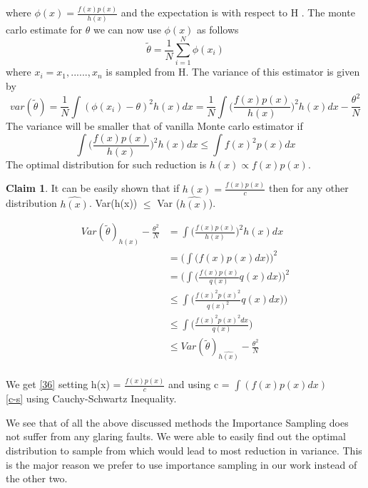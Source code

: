 \documentclass[a4paper,twoside]{iiththesis}
\theoremstyle{definition}
\theoremstyle{definition}
\newtheorem{claim}{Claim}[section]
\theoremstyle{remark}
\begin{document}
where $\phi(x) = \frac{f(x) p(x)} {h(x)}$ and the expectation is with respect to H . The monte carlo estimate for $\theta$ we can now use $\phi(x)$ as follows 
\begin{equation}
\widetilde{\theta} = \frac{1}{N} \sum_{i=1}^N \phi(x_i) 
\end{equation}
where $x_i = x_1, ......, x_n$ is sampled from H. The variance of this estimator is given by 
\begin{equation}\label{Variance Importance Sampling}
var(\widetilde{\theta}) = \frac{1}{N} \int (\phi(x_i) - \theta)^2 h(x) dx = 
\frac{1}{N}\int  \Big(\frac{f(x)p(x)}{h(x)}\Big)^2  h(x) dx  -\frac{\theta^2}{N}
\end{equation}
The variance will be smaller that of vanilla Monte carlo estimator if 
\begin{equation}
\int  \Big(\frac{f(x)p(x)}{h(x)}\Big)^2  h(x) dx  \leq \int f(x)^2 p(x) dx 
\end{equation}
The optimal distribution for such reduction is $h(x) \propto f(x) p(x)$. \\
\begin{claim}
It can be easily shown that if $h(x) = \frac{f(x) p(x)} {c}$ then for any other distribution 
$\hat{h(x)}$. Var(h(x)) $\leq$ Var ($\hat{h(x)}$).
\end{claim}
\begin{align}
Var(\widetilde{\theta})_{h(x)} - \frac{\theta^2} {N} &= \int  \Big(\frac{f(x)p(x)}{h(x)}\Big)^2  h(x) dx \\
&= \bigg(\int \Big(f(x)p(x) dx \Big)   \bigg)^2 \label{36} \\ 
&= \bigg(\int \Big(\frac{f(x)p(x)}{q(x)}q(x) dx \Big)\bigg )^2 \\
&\leq \int \Big(\frac{f(x)^2p(x)^2}{q(x)^2}q(x) dx )\Big)  \label{c-s} \\ 
&\leq \int \Big(\frac{f(x)^2p(x)^2 dx}{q(x)} \Big) \\
&\leq Var(\widetilde{\theta})_{\hat{h(x)}} - \frac{\theta^2} {N}
\end{align}
\\
We get \ref{36} setting h(x) = $\frac{f(x)p(x)} {c}$ and using c = $\int (f(x)p(x) dx)$ \\
\ref{c-s} using Cauchy-Schwartz Inequality.

We see that of all the above discussed methods the Importance Sampling does not suffer from any glaring faults. We were able to easily find out the optimal distribution to sample from which would lead to most reduction in variance. This is the major reason we prefer to use importance sampling in our work instead of the other two.
\end{document}
